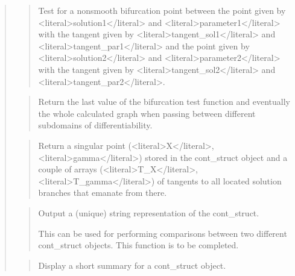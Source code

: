 \documentclass[a4paper,11pt,english]{sphinxmanual}
\begin{document}
\begin{quote}
\begin{quote}
\sphinxAtStartPar
Test for a non\sphinxhyphen{}smooth bifurcation point between the point given by
\textless{}literal\textgreater{}solution1\textless{}/literal\textgreater{} and \textless{}literal\textgreater{}parameter1\textless{}/literal\textgreater{} with the tangent given by \textless{}literal\textgreater{}tangent\_sol1\textless{}/literal\textgreater{}
and \textless{}literal\textgreater{}tangent\_par1\textless{}/literal\textgreater{} and the point given by \textless{}literal\textgreater{}solution2\textless{}/literal\textgreater{} and \textless{}literal\textgreater{}parameter2\textless{}/literal\textgreater{}
with the tangent given by \textless{}literal\textgreater{}tangent\_sol2\textless{}/literal\textgreater{} and \textless{}literal\textgreater{}tangent\_par2\textless{}/literal\textgreater{}.
\end{quote}

\sphinxAtStartPar
{}
\begin{quote}

\sphinxAtStartPar
Return the last value of the bifurcation test function and eventually
the whole calculated graph when passing between different sub\sphinxhyphen{}domains
of differentiability.
\end{quote}

\sphinxAtStartPar
{}
\begin{quote}

\sphinxAtStartPar
Return a singular point (\textless{}literal\textgreater{}X\textless{}/literal\textgreater{}, \textless{}literal\textgreater{}gamma\textless{}/literal\textgreater{}) stored in the cont\_struct object and a
couple of arrays (\textless{}literal\textgreater{}T\_X\textless{}/literal\textgreater{}, \textless{}literal\textgreater{}T\_gamma\textless{}/literal\textgreater{}) of tangents to all located solution
branches that emanate from there.
\end{quote}

\sphinxAtStartPar
{}
\begin{quote}

\sphinxAtStartPar
Output a (unique) string representation of the cont\_struct.

\sphinxAtStartPar
This can be used for performing comparisons between two
different cont\_struct objects.
This function is to be completed.
\end{quote}

\sphinxAtStartPar
{}
\begin{quote}

\sphinxAtStartPar
Display a short summary for a cont\_struct object.
\end{quote}
\end{quote}
\end{document}
